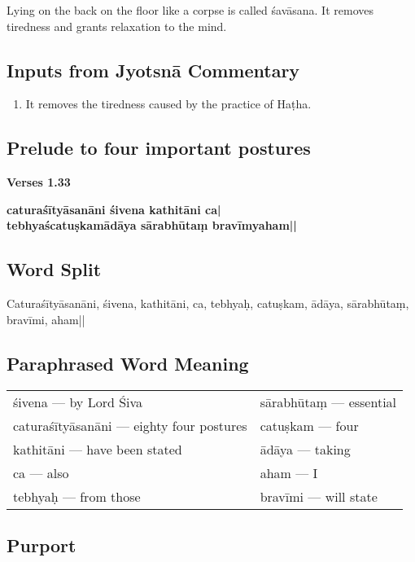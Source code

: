 Lying on the back on the floor like a corpse is called śavāsana. It removes tiredness and grants relaxation to the mind. 

\subsection*{Inputs from Jyotsnā Commentary}

\begin{enumerate}
\item It removes the tiredness caused by the practice of Haṭha. 
\end{enumerate}

\subsection*{Prelude to four important postures}

\noindent 
\textbf{Verses 1.33}

\begin{shloka}
\textbf{caturaśītyāsanāni śivena kathitāni ca|}\\
\textbf{tebhyaścatuṣkamādāya sārabhūtaṃ bravīmyaham||}
\end{shloka}

\subsection*{Word Split}

Caturaśītyāsanāni, śivena, kathitāni, ca, tebhyaḥ, catuṣkam, ādāya, sārabhūtaṃ, bravīmi, aham||

\subsection*{Paraphrased Word Meaning}

\begin{longtable}{>{\noindent\raggedright}p{5cm}>{\noindent\raggedright}p{5cm}}
śivena --- by Lord Śiva & sārabhūtaṃ --- essential\tabularnewline
caturaśītyāsanāni --- eighty four postures  & catuṣkam --- four\tabularnewline
kathitāni --- have been stated  & ādāya --- taking\tabularnewline
ca --- also & aham  --- I\tabularnewline
tebhyaḥ --- from those & bravīmi --- will state
\end{longtable}

\subsection*{Purport}

